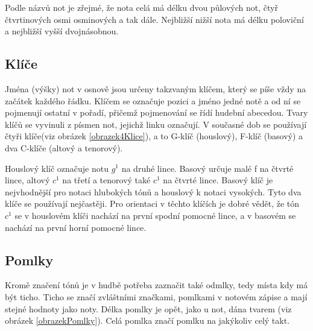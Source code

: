 

Podle názvů not je zřejmé, že nota celá má délku dvou půlových not, čtyř čtvrtinových osmi osminových a tak dále.
Nejbližší nižší nota má délku poloviční a nejbližší vyšší dvojnásobnou.\par

\subsection*{Klíče}
Jména (výšky) not v osnově jsou určeny takzvaným klíčem, který se píše vždy na začátek každého řádku.
Klíčem se označuje pozici a jméno jedné notě a od ní se pojmenují ostatní v pořadí, 
přičemž pojmenování se řídí hudební abecedou.
Tvary klíčů se vyvinuli z písmen not, jejichž linku označují.
V současné dob se používají čtyři klíče(viz obrázek \ref{obrazek4Klice}), a to G-klíč (houslový), F-klíč (basový) a dva C-klíče (altový a tenorový).


Houslový klíč označuje notu $g^1$ na druhé lince.
Basový určuje malé f na čtvrté lince, altový $c^1$ na třetí a tenorový také $c^1$ na čtvrté lince.
Basový klíč je nejvhodnější pro notaci hlubokých tónů a houslový k notaci vysokých.
Tyto dva klíče se používají nejčastěji. 
Pro orientaci v těchto klíčích je dobré vědět, že
tón $c^1$ se v houslovém klíči nachází na první spodní pomocné lince, 
a v basovém se nachází na první horní pomocné lince.\cite{cmiral,zenkl}\par

\subsection*{Pomlky}
Kromě značení tónů je v hudbě potřeba zaznačit také odmlky, tedy místa kdy má být ticho.
Ticho se značí zvláštními značkami, pomlkami v notovém zápise a mají stejné hodnoty jako noty.
Délka pomlky je opět, jako u not, dána tvarem (viz obrázek \ref{obrazekPomlky}).
Celá pomlka značí pomlku na jakýkoliv celý takt.\cite{cmiral,zenkl}

